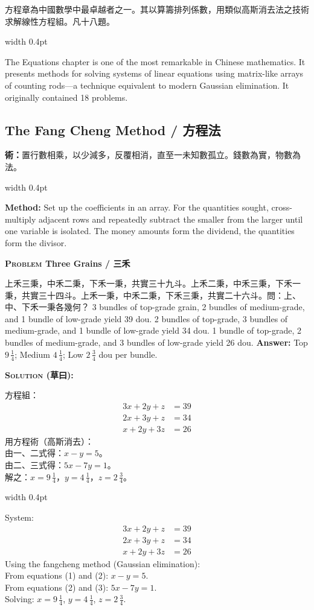 \documentclass[10pt,a4paper]{article}
\newcommand{\zh}[1]{{\CJKfamily{notocjksc}#1}}
\newcommand{\bilingual}[2]{%
  \par\smallskip\noindent%
  \begin{minipage}[t]{0.47\textwidth}%
    \RaggedRight\small #1%
  \end{minipage}%
  \hfill\vrule width 0.4pt\hfill%
  \begin{minipage}[t]{0.47\textwidth}%
    \RaggedRight\small #2%
  \end{minipage}%
  \par\smallskip%
}
\newenvironment{biproblem}[2][]{%
  \par\smallskip\vspace{1.5ex}%
  \noindent\textbf{\textcolor{problemframe}{\textsc{Problem} #1}}\par\smallskip
  \bgroup\small%
}{%
  \egroup\par\smallskip
}
\newenvironment{bisolution}{%
  \par\smallskip\noindent\textbf{\textcolor{notecolor}{\textsc{Solution} (草曰):}}\par\smallskip\itshape\small%
}{%
  \par\smallskip\normalfont%
}
\begin{document}
\bilingual{
  方程章為中國數學中最卓越者之一。其以算籌排列係數，用類似高斯消去法之技術求解線性方程組。凡十八題。
}{%
  The Equations chapter is one of the most remarkable in Chinese mathematics. It presents methods for solving systems of linear equations using matrix-like arrays of counting rods---a technique equivalent to modern Gaussian elimination. It originally contained 18 problems.
}

\subsection{The Fang Cheng Method / \zh{方程法}}

\bilingual{
  \textbf{術：}置行數相乘，以少減多，反覆相消，直至一未知數孤立。錢數為實，物數為法。
}{%
  \textbf{Method:} Set up the coefficients in an array. For the quantities sought, cross-multiply adjacent rows and repeatedly subtract the smaller from the larger until one variable is isolated. The money amounts form the dividend, the quantities form the divisor.
}

\begin{biproblem}[Three Grains / 三禾]
\bilingual{
  \zh{上禾三秉，中禾二秉，下禾一秉，共實三十九斗。上禾二秉，中禾三秉，下禾一秉，共實三十四斗。上禾一秉，中禾二秉，下禾三秉，共實二十六斗。問：上、中、下禾一秉各幾何？}
}{%
  3 bundles of top-grade grain, 2 bundles of medium-grade, and 1 bundle of low-grade yield 39 dou. 2 bundles of top-grade, 3 bundles of medium-grade, and 1 bundle of low-grade yield 34 dou. 1 bundle of top-grade, 2 bundles of medium-grade, and 3 bundles of low-grade yield 26 dou. \textbf{Answer:} Top $9\,\frac{1}{4}$; Medium $4\,\frac{1}{4}$; Low $2\,\frac{3}{4}$ dou per bundle.
}
\end{biproblem}

\begin{bisolution}
\bilingual{
  方程組：
  \begin{align*}
  3x + 2y + z &= 39 \\
  2x + 3y + z &= 34 \\
  x + 2y + 3z &= 26
  \end{align*}
  用方程術（高斯消去）：\\
  由一、二式得：$x - y = 5$。\\
  由二、三式得：$5x - 7y = 1$。\\
  解之：$x = 9\,\frac{1}{4}$，$y = 4\,\frac{1}{4}$，$z = 2\,\frac{3}{4}$。
}{%
  System:
  \begin{align*}
  3x + 2y + z &= 39 \\
  2x + 3y + z &= 34 \\
  x + 2y + 3z &= 26
  \end{align*}
  Using the fangcheng method (Gaussian elimination):\\
  From equations (1) and (2): $x - y = 5$.\\
  From equations (2) and (3): $5x - 7y = 1$.\\
  Solving: $x = 9\,\frac{1}{4}$, $y = 4\,\frac{1}{4}$, $z = 2\,\frac{3}{4}$.
}
\end{bisolution}
\end{document}
